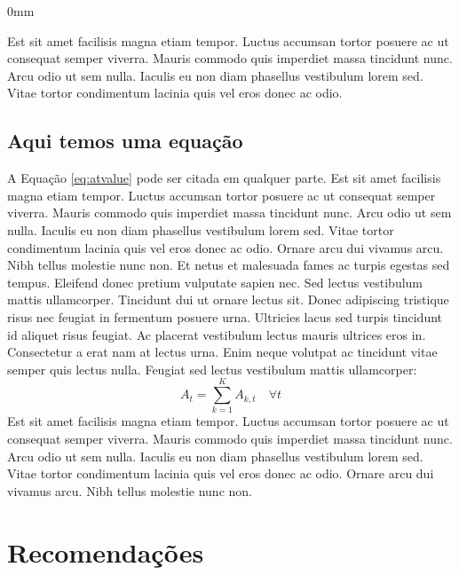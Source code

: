 \documentclass[./main.tex]{subfiles}
\begin{document}
\begin{adjustwidth}{\bodytab}{0mm}

\par Est sit amet facilisis magna etiam tempor. Luctus accumsan tortor posuere ac ut consequat semper viverra. Mauris commodo quis imperdiet massa tincidunt nunc. Arcu odio ut sem nulla. Iaculis eu non diam phasellus vestibulum lorem sed. Vitae tortor condimentum lacinia quis vel eros donec ac odio.

\subsection{Aqui temos uma equação} \label{chp1:sec3:sub1}

\par A Equação \eqref{eq:atvalue} pode ser citada em qualquer parte. Est sit amet facilisis magna etiam tempor. Luctus accumsan tortor posuere ac ut consequat semper viverra. Mauris commodo quis imperdiet massa tincidunt nunc. Arcu odio ut sem nulla. Iaculis eu non diam phasellus vestibulum lorem sed. Vitae tortor condimentum lacinia quis vel eros donec ac odio. Ornare arcu dui vivamus arcu. Nibh tellus molestie nunc non. Et netus et malesuada fames ac turpis egestas sed tempus. Eleifend donec pretium vulputate sapien nec. Sed lectus vestibulum mattis ullamcorper. Tincidunt dui ut ornare lectus sit. Donec adipiscing tristique risus nec feugiat in fermentum posuere urna. Ultricies lacus sed turpis tincidunt id aliquet risus feugiat. Ac placerat vestibulum lectus mauris ultrices eros in. Consectetur a erat nam at lectus urna. Enim neque volutpat ac tincidunt vitae semper quis lectus nulla. Feugiat sed lectus vestibulum mattis ullamcorper:
\begin{equation}
\label{eq:atvalue}
A_{t}= \sum_{k=1}^{K} A_{k, t} \quad \forall t
\end{equation}
Est sit amet facilisis magna etiam tempor. Luctus accumsan tortor posuere ac ut consequat semper viverra. Mauris commodo quis imperdiet massa tincidunt nunc. Arcu odio ut sem nulla. Iaculis eu non diam phasellus vestibulum lorem sed. Vitae tortor condimentum lacinia quis vel eros donec ac odio. Ornare arcu dui vivamus arcu. Nibh tellus molestie nunc non.

\blindtext[2]
\end{adjustwidth}

\section{Recomendações} \label{chp1:summary}
\end{document}
